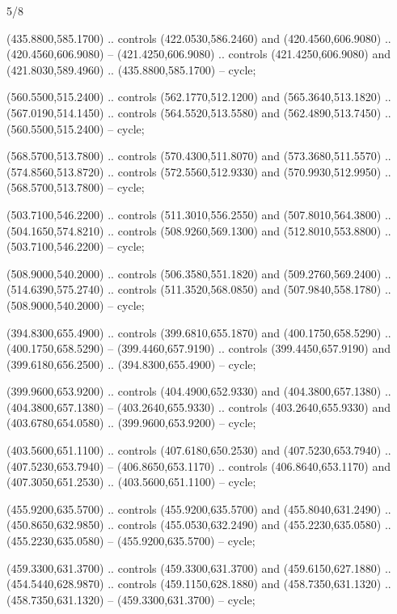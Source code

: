 \begin{flagdescription}{5/8}
\begin{scope}[shift={(m)}]
\begin{scope}[scale=\flagwidth/220,y=0.1mm, x=0.1mm, yscale=-1,shift={(-596,-360)}]
\begin{scope}[cm={{-1.0,0.0,0.0,1.0,(1193.9797,0.0)}}]
\begin{scope}[draw=black,line join=round,line cap=round,line width=0.381\lw]
\begin{scope}[fill=gold]
\end{scope}
\begin{scope}[fill=black]
 (435.8800,585.1700) .. controls (422.0530,586.2460) and
  (420.4560,606.9080) .. (420.4560,606.9080) -- (421.4250,606.9080) .. controls
  (421.4250,606.9080) and (421.8030,589.4960) .. (435.8800,585.1700) -- cycle;

 (560.5500,515.2400) .. controls (562.1770,512.1200) and
  (565.3640,513.1820) .. (567.0190,514.1450) .. controls (564.5520,513.5580) and
  (562.4890,513.7450) .. (560.5500,515.2400) -- cycle;

 (568.5700,513.7800) .. controls (570.4300,511.8070) and
  (573.3680,511.5570) .. (574.8560,513.8720) .. controls (572.5560,512.9330) and
  (570.9930,512.9950) .. (568.5700,513.7800) -- cycle;

 (503.7100,546.2200) .. controls (511.3010,556.2550) and
  (507.8010,564.3800) .. (504.1650,574.8210) .. controls (508.9260,569.1300) and
  (512.8010,553.8800) .. (503.7100,546.2200) -- cycle;

 (508.9000,540.2000) .. controls (506.3580,551.1820) and
  (509.2760,569.2400) .. (514.6390,575.2740) .. controls (511.3520,568.0850) and
  (507.9840,558.1780) .. (508.9000,540.2000) -- cycle;

 (394.8300,655.4900) .. controls (399.6810,655.1870) and
  (400.1750,658.5290) .. (400.1750,658.5290) -- (399.4460,657.9190) .. controls
  (399.4450,657.9190) and (399.6180,656.2500) .. (394.8300,655.4900) -- cycle;

 (399.9600,653.9200) .. controls (404.4900,652.9330) and
  (404.3800,657.1380) .. (404.3800,657.1380) -- (403.2640,655.9330) .. controls
  (403.2640,655.9330) and (403.6780,654.0580) .. (399.9600,653.9200) -- cycle;

 (403.5600,651.1100) .. controls (407.6180,650.2530) and
  (407.5230,653.7940) .. (407.5230,653.7940) -- (406.8650,653.1170) .. controls
  (406.8640,653.1170) and (407.3050,651.2530) .. (403.5600,651.1100) -- cycle;

 (455.9200,635.5700) .. controls (455.9200,635.5700) and
  (455.8040,631.2490) .. (450.8650,632.9850) .. controls (455.0530,632.2490) and
  (455.2230,635.0580) .. (455.2230,635.0580) -- (455.9200,635.5700) -- cycle;

 (459.3300,631.3700) .. controls (459.3300,631.3700) and
  (459.6150,627.1880) .. (454.5440,628.9870) .. controls (459.1150,628.1880) and
  (458.7350,631.1320) .. (458.7350,631.1320) -- (459.3300,631.3700) -- cycle;


\end{scope}
\end{scope}
\end{scope}
\end{scope}
\end{scope}
\end{flagdescription}
